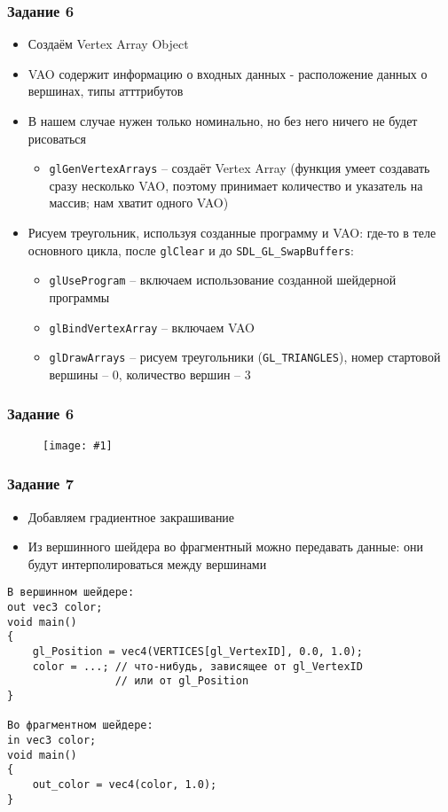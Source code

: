\documentclass{beamer}
\newcommand{\slideimage}[1]{
  \begin{figure}
    \begin{adjustbox}{width=\textwidth, totalheight=\textheight-2\baselineskip-2\baselineskip,keepaspectratio}
      \texttt{[image: \#1]}
    \end{adjustbox}
  \end{figure}
}
\begin{document}
\begin{frame}[fragile]
\frametitle{Задание 6}
\begin{itemize}
\item Создаём Vertex Array Object
\item VAO содержит информацию о входных данных - расположение данных о вершинах, типы атттрибутов
\item В нашем случае нужен только номинально, но без него ничего не будет рисоваться
\pause
\begin{itemize}
\item \verb|glGenVertexArrays| -- создаёт Vertex Array (функция умеет создавать сразу несколько VAO, поэтому принимает количество и указатель на массив; нам хватит одного VAO)
\end{itemize}
\pause
\item Рисуем треугольник, используя созданные программу и VAO: где-то в теле основного цикла, после \verb|glClear| и до \verb|SDL_GL_SwapBuffers|:
\begin{itemize}
\item \verb|glUseProgram| -- включаем использование созданной шейдерной программы
\item \verb|glBindVertexArray| -- включаем VAO
\item \verb|glDrawArrays| -- рисуем треугольники (\verb|GL_TRIANGLES|), номер стартовой вершины -- 0, количество вершин -- 3
\end{itemize}
\end{itemize}
\end{frame}

\begin{frame}[fragile]
\frametitle{Задание 6}
\slideimage{task_6.png}
\end{frame}

\begin{frame}[fragile]
\frametitle{Задание 7}
\fontsize{8pt}{8pt}\selectfont
\begin{itemize}
\item Добавляем градиентное закрашивание
\item Из вершинного шейдера во фрагментный можно передавать данные: они будут интерполироваться между вершинами
\end{itemize}
\pause
\begin{verbatim}
В вершинном шейдере:
out vec3 color;
void main()
{
    gl_Position = vec4(VERTICES[gl_VertexID], 0.0, 1.0);
    color = ...; // что-нибудь, зависящее от gl_VertexID 
                 // или от gl_Position
}

Во фрагментном шейдере:
in vec3 color;
void main()
{
    out_color = vec4(color, 1.0);
}
\end{verbatim}
\end{frame}
\end{document}
